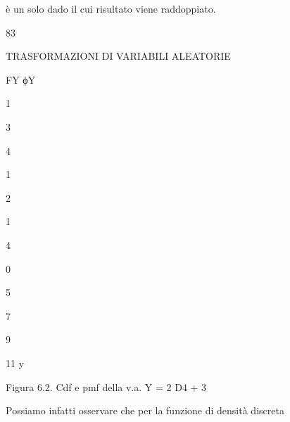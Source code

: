 \documentclass[a4paper,portrait,12pt]{article}
\begin{document}
\begin{flushleft}
\`{e} un solo dado il cui risultato viene raddoppiato.
\end{flushleft}





83










\begin{flushleft}
TRASFORMAZIONI DI VARIABILI ALEATORIE
\end{flushleft}





\begin{flushleft}
FY ϕY
\end{flushleft}


1


3


4


1


2


1


4





0





5





7





9





\begin{flushleft}
11 y
\end{flushleft}





\begin{flushleft}
Figura 6.2. Cdf e pmf della v.a. Y = 2 D4 + 3
\end{flushleft}





\begin{flushleft}
Possiamo infatti osservare che per la funzione di densit\`{a} discreta
\end{flushleft}
\end{document}
